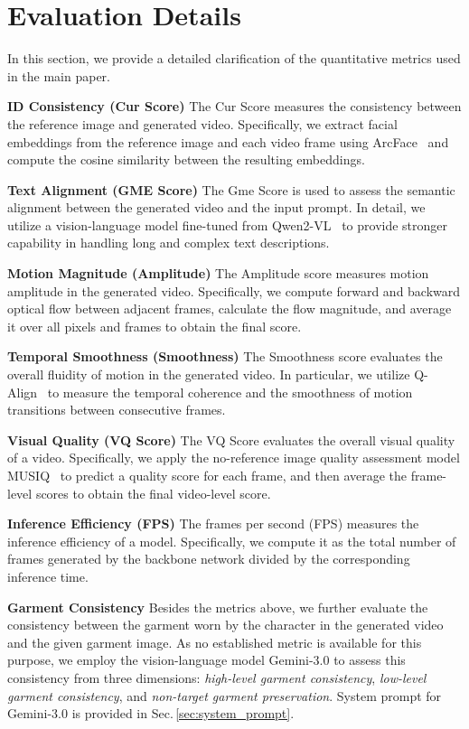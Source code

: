\documentclass{llmxive}
\begin{document}
\section{Evaluation Details}
% 
In this section, we provide a detailed clarification of the quantitative metrics used in the main paper.


\noindent
\textbf{ID Consistency (Cur Score)}
% 
The Cur Score measures the consistency between the reference image and generated video.
Specifically, we extract facial embeddings from the reference image and each video frame using ArcFace~\cite{deng2019arcface} and compute the cosine similarity between the resulting embeddings.


\noindent
\textbf{Text Alignment (GME Score)}
% 
The Gme Score is used to assess the semantic alignment between the generated video and the input prompt.
In detail, we utilize a vision-language model fine-tuned from Qwen2-VL~\cite{wang2024qwen2} to provide stronger capability in handling long and complex text descriptions.


\noindent
\textbf{Motion Magnitude (Amplitude)}
% 
The Amplitude score measures motion amplitude in the generated video.
Specifically, we compute forward and backward optical flow between adjacent frames, calculate the flow magnitude, and average it over all pixels and frames to obtain the final score.


\noindent
\textbf{Temporal Smoothness (Smoothness)}
% 
The Smoothness score evaluates the overall fluidity of motion in the generated video.
In particular, we utilize Q-Align~\cite{wu2023q} to measure the temporal coherence and the smoothness of motion transitions between consecutive frames.


\noindent
\textbf{Visual Quality (VQ Score)}
% 
The VQ Score evaluates the overall visual quality of a video.
Specifically, we apply the no-reference image quality assessment model MUSIQ~\cite{ke2021musiq} to predict a quality score for each frame, and then average the frame-level scores to obtain the final video-level score.


\noindent
\textbf{Inference Efficiency (FPS)}
% 
The frames per second (FPS) measures the inference efficiency of a model.
Specifically, we compute it as the total number of frames generated by the backbone network divided by the corresponding inference time.


\noindent
\textbf{Garment Consistency}
Besides the metrics above, we further evaluate the consistency between the garment worn by the character in the generated video and the given garment image.
As no established metric is available for this purpose, we employ the vision-language model Gemini-3.0 to assess this consistency from three dimensions: \textit{high-level garment consistency}, \textit{low-level garment consistency}, and \textit{non-target garment preservation}.
% 
System prompt for Gemini-3.0 is provided in Sec.\,\ref{sec:system_prompt}.
\end{document}
